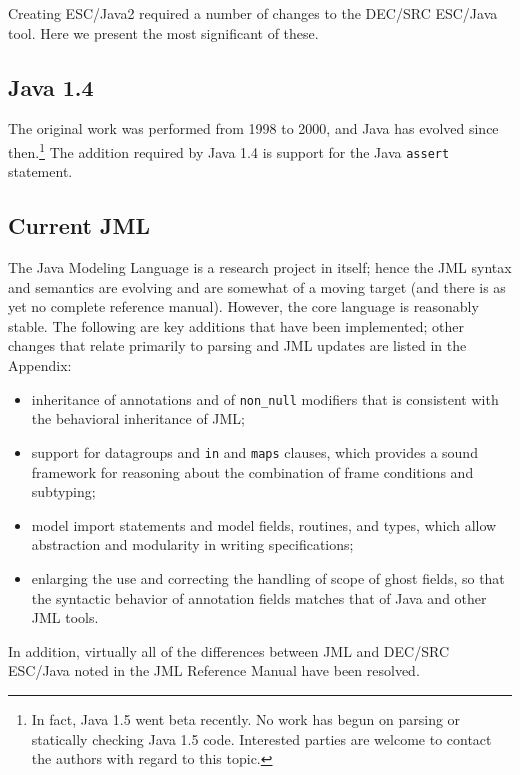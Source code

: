 \documentclass{llncs}
\begin{document}
Creating ESC/Java2 required a number of changes to the DEC/SRC
ESC/Java tool.  Here we present the most significant of these.

\subsection{Java 1.4}
The original work was performed from 1998 to 2000, and Java has
evolved since then.\footnote{In fact, Java 1.5 went beta recently.  No
  work has begun on parsing or statically checking Java 1.5 code.
  Interested parties are welcome to contact the authors with regard to
  this topic.}  The addition required by Java 1.4 is support for the
Java {\tt assert} statement.


\subsection{Current JML}
The Java Modeling Language is a research project in itself; hence the
JML syntax and semantics are evolving and are somewhat of a moving
target (and there is as yet no complete reference manual).  However,
the core language is reasonably stable.  The following are key
additions that have been implemented; other changes that relate
primarily to parsing and JML updates are listed in the Appendix:

\setlength{\partopsep}{0in}\setlength{\parskip}{0in}\setlength{\itemsep}{0in}\setlength{\topsep}{0in}
\begin{itemize}
\setlength{\partopsep}{0in}\setlength{\parskip}{0in}\setlength{\itemsep}{0in}\setlength{\topsep}{0in}
\item inheritance of annotations and of \texttt{non\_null} modifiers
  that is consistent with the behavioral inheritance of JML;
\item support for datagroups and \texttt{in} and \texttt{maps}
  clauses, which provides a sound framework for reasoning about the
  combination of frame conditions and subtyping;
\item model import statements and model fields, routines, and types,
  which allow abstraction and modularity in writing specifications;
\item enlarging the use and correcting the handling of scope of ghost
  fields, so that the syntactic behavior of annotation fields matches
  that of Java and other JML tools.
\end{itemize}
In addition, virtually all of the differences between JML and DEC/SRC
ESC/Java noted in the JML Reference Manual have been resolved.
\end{document}
